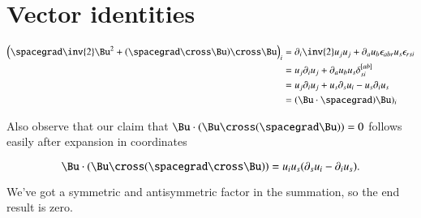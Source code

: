 \label{chap:appendix:constantSpinSurfaces}
\section{Vector identities}

\begin{equation}\label{eqn:constantSpinSurfaces:170}
\begin{aligned}
\left( \spacegrad \inv{2} \Bu^2 + (\spacegrad \cross \Bu) \cross \Bu \right)_i
&=
\partial_i \inv{2} u_j u_j + \partial_a u_b \epsilon_{a b r} u_s \epsilon_{r s i} \\
&=
u_j \partial_i u_j + \partial_a u_b u_s \delta^{[a b]}_{s i} \\
&=
u_j \partial_i u_j 
+ u_s \partial_s u_i 
- u_s \partial_i u_s \\
&= (\Bu \cdot \spacegrad) \Bu)_i 
\end{aligned}
\end{equation}

Also observe that our claim that $\Bu \cdot (\Bu \cross (\spacegrad \Bu)) = 0$ follows easily after expansion in coordinates

\begin{equation}\label{eqn:constantSpinSurfaces:190}
\Bu \cdot (\Bu \cross (\spacegrad \cross \Bu) )
=
u_i u_s ( \partial_s u_i - \partial_i u_s ).
\end{equation}

We've got a symmetric and antisymmetric factor in the summation, so the end result is zero.



